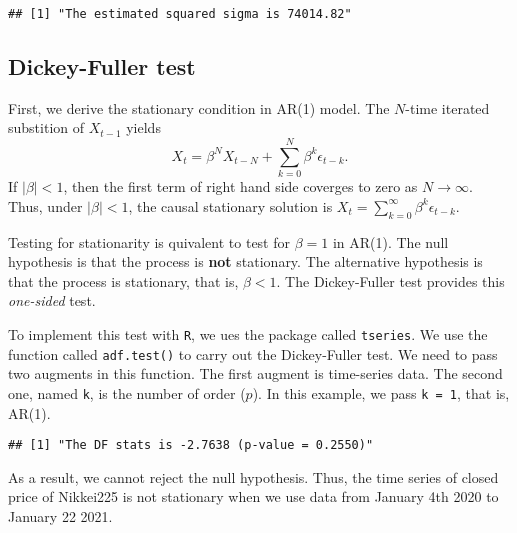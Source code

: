 \documentclass[
  12pt,
]{article}
\newenvironment{Shaded}{\begin{snugshade}}{\end{snugshade}}
\newcommand{\DataTypeTok}[1]{\textcolor[rgb]{0.13,0.29,0.53}{#1}}
\newcommand{\DecValTok}[1]{\textcolor[rgb]{0.00,0.00,0.81}{#1}}
\newcommand{\KeywordTok}[1]{\textcolor[rgb]{0.13,0.29,0.53}{\textbf{#1}}}
\newcommand{\NormalTok}[1]{#1}
\newcommand{\OperatorTok}[1]{\textcolor[rgb]{0.81,0.36,0.00}{\textbf{#1}}}
\newcommand{\StringTok}[1]{\textcolor[rgb]{0.31,0.60,0.02}{#1}}
\begin{document}
\begin{Shaded}
\end{Shaded}

\begin{verbatim}
## [1] "The estimated squared sigma is 74014.82"
\end{verbatim}

\hypertarget{dickey-fuller-test}{%
\subsection{Dickey-Fuller test}\label{dickey-fuller-test}}

First, we derive the stationary condition in AR(1) model. The \(N\)-time
iterated substition of \(X_{t-1}\) yields
\[ X_t = \beta^N X_{t-N} + \sum_{k = 0}^N \beta^k \epsilon_{t-k}. \] If
\(|\beta| < 1\), then the first term of right hand side coverges to zero
as \(N \to \infty\). Thus, under \(|\beta| < 1\), the causal stationary
solution is \(X_t = \sum_{k=0}^{\infty} \beta^k \epsilon_{t-k}\).

Testing for stationarity is quivalent to test for \(\beta = 1\) in
AR(1). The null hypothesis is that the process is \textbf{not}
stationary. The alternative hypothesis is that the process is
stationary, that is, \(\beta < 1\). The Dickey-Fuller test provides this
\emph{one-sided} test.

To implement this test with \texttt{R}, we ues the package called
\texttt{tseries}. We use the function called \texttt{adf.test()} to
carry out the Dickey-Fuller test. We need to pass two augments in this
function. The first augment is time-series data. The second one, named
\texttt{k}, is the number of order (\(p\)). In this example, we pass
\texttt{k\ =\ 1}, that is, AR(1).

\begin{Shaded}
\end{Shaded}

\begin{verbatim}
## [1] "The DF stats is -2.7638 (p-value = 0.2550)"
\end{verbatim}

As a result, we cannot reject the null hypothesis. Thus, the time series
of closed price of Nikkei225 is not stationary when we use data from
January 4th 2020 to January 22 2021.
\end{document}
